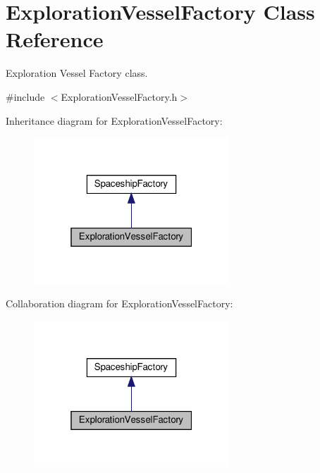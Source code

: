 \hypertarget{classExplorationVesselFactory}{}\section{Exploration\+Vessel\+Factory Class Reference}
\label{classExplorationVesselFactory}


Exploration Vessel Factory class.  




{\ttfamily \#include $<$Exploration\+Vessel\+Factory.\+h$>$}



Inheritance diagram for Exploration\+Vessel\+Factory\+:\nopagebreak
\begin{figure}[H]
\begin{center}
\leavevmode
\includegraphics[width=208pt]{classExplorationVesselFactory__inherit__graph}
\end{center}
\end{figure}


Collaboration diagram for Exploration\+Vessel\+Factory\+:\nopagebreak
\begin{figure}[H]
\begin{center}
\leavevmode
\includegraphics[width=208pt]{classExplorationVesselFactory__coll__graph}
\end{center}
\end{figure}
